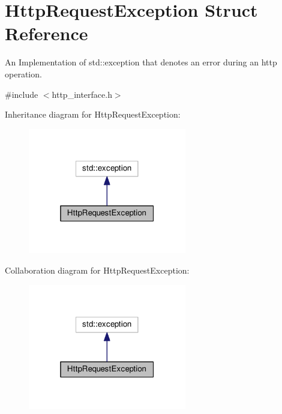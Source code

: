 \hypertarget{structHttpRequestException}{}\section{Http\+Request\+Exception Struct Reference}
\label{structHttpRequestException}


An Implementation of std\+::exception that denotes an error during an http operation.  




{\ttfamily \#include $<$http\+\_\+interface.\+h$>$}



Inheritance diagram for Http\+Request\+Exception\+:
\nopagebreak
\begin{figure}[H]
\begin{center}
\leavevmode
\includegraphics[width=196pt]{structHttpRequestException__inherit__graph}
\end{center}
\end{figure}


Collaboration diagram for Http\+Request\+Exception\+:
\nopagebreak
\begin{figure}[H]
\begin{center}
\leavevmode
\includegraphics[width=196pt]{structHttpRequestException__coll__graph}
\end{center}
\end{figure}
